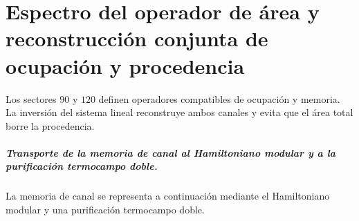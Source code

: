 \chapter{Espectro del operador de área y reconstrucción conjunta de ocupación y procedencia}
\label{chap:parte-iv-59}

Los sectores \(90\) y \(120\) definen operadores compatibles de ocupación y memoria. La inversión del sistema lineal reconstruye ambos canales y evita que el área total borre la procedencia.



\paragraph{Transporte de la memoria de canal al Hamiltoniano modular y a la purificación termocampo doble.} La memoria de canal se representa a continuación mediante el Hamiltoniano modular y una purificación termocampo doble.
